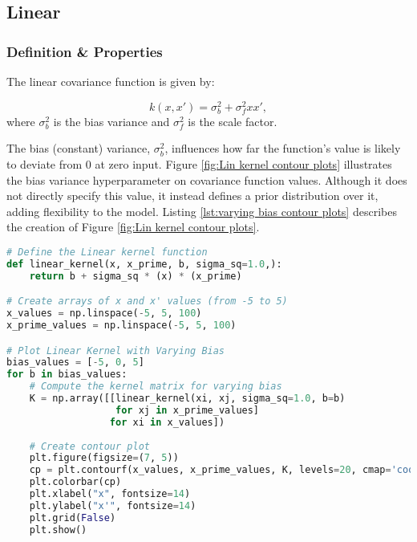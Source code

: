 \documentclass[12pt,a4paper]{article}
\begin{document}
\newpage
\subsection{Linear}
\label{sec:Lin kernel}

\subsubsection{Definition \& Properties}

The linear covariance function is given by: 

\begin{equation}
k(x,x') = \sigma_b^2 + \sigma_f^2 x  x',
\end{equation}
where \( \sigma_b^2 \) is the bias variance and \( \sigma_f^2 \) is the scale factor.

The bias (constant) variance, \( \sigma_b^2 \), influences how far the function's value is likely to deviate from 0 at zero input. Figure \ref{fig:Lin kernel contour plots}  illustrates the bias variance hyperparameter on covariance function values. Although it does not directly specify this value, it instead defines a prior distribution over it, adding flexibility to the model. Listing \ref{lst:varying bias contour plots} describes the creation of Figure \ref{fig:Lin kernel contour plots}.

\vspace{10pt}
\begin{lstlisting}[language=python, caption={Code of creating the the varying bias contour plots.}, label={lst:varying bias contour plots}]
# Define the Linear kernel function
def linear_kernel(x, x_prime, b, sigma_sq=1.0,):
    return b + sigma_sq * (x) * (x_prime)

# Create arrays of x and x' values (from -5 to 5)
x_values = np.linspace(-5, 5, 100)  
x_prime_values = np.linspace(-5, 5, 100)

# Plot Linear Kernel with Varying Bias
bias_values = [-5, 0, 5]  
for b in bias_values:
    # Compute the kernel matrix for varying bias
    K = np.array([[linear_kernel(xi, xj, sigma_sq=1.0, b=b) 
                   for xj in x_prime_values]                   
                  for xi in x_values])
    
    # Create contour plot
    plt.figure(figsize=(7, 5))
    cp = plt.contourf(x_values, x_prime_values, K, levels=20, cmap='coolwarm')
    plt.colorbar(cp)
    plt.xlabel("x", fontsize=14)
    plt.ylabel("x'", fontsize=14)
    plt.grid(False)
    plt.show()

\end{lstlisting}
\end{document}
